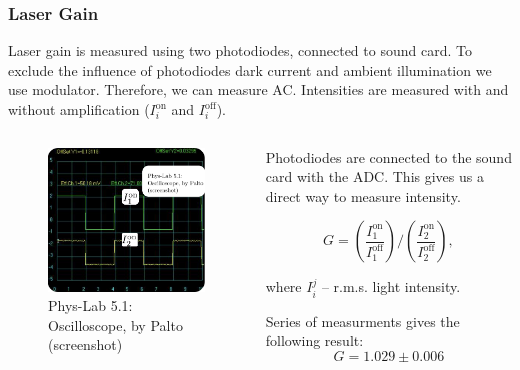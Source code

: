\documentclass{beamer}
\begin{document}
	
	\begin{frame}
		\frametitle{Laser Gain}
		Laser gain is measured using two photodiodes, connected to sound card. To exclude the influence of photodiodes dark current and ambient illumination we use modulator. Therefore, we can measure AC. Intensities are measured with and without amplification ($I_i^{\text{on}}$ and $I_i^{\text{off}}$).
		
		\begin{columns}
			\begin{column}{0.4\textwidth}
				\begin{figure}
					\centering
					\includegraphics[width=1\linewidth]{res/oscilloscope.png}
					\caption{Phys-Lab 5.1: Oscilloscope, by Palto (screenshot)}
				\end{figure}
			\end{column}
			\begin{column}{0.6\textwidth}
				Photodiodes are connected to the sound card with the ADC. This gives us a direct way to measure intensity. 
				
				$$G = \left(\frac{I^{\text{on}}_{1}}{I^{\text{off}}_{1}}\right)/\left(\frac{I^{\text{on}}_{2}}{I^{\text{off}}_{2}}\right),$$
				
				where $I_i^j$ -- r.m.s. light intensity.
				
				Series of measurments gives the following result:
				$$G = 1.029 \pm 0.006$$
			\end{column}
		\end{columns}
		
	\end{frame}
		
\end{document}
